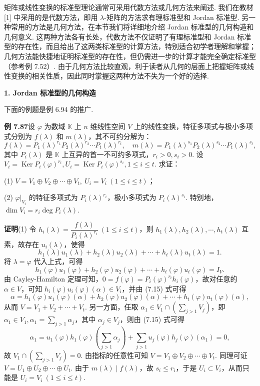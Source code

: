 \documentclass[UTF8, 12pt, fontset=fandol, oneside]{ctexart}
\begin{document}
矩阵或线性变换的标准型理论通常可采用代数方法或几何方法来阐述. 我们在教材 [1] 中采用的是代数方法，即用 $\lambda$-矩阵的方法求有理标准型和 Jordan 标准型. 另一种常用的方法是几何方法，在本节我们将详细地介绍 Jordan 标准型的几何构造和几何意义. 这两种方法各有长处，代数方法不仅证明了有理标准型和 Jordan 标准型的存在性，而且给出了这两类标准型的计算方法，特别适合初学者理解和掌握；几何方法能快捷地证明标准型的存在性，但仍需进一步的计算才能完全确定标准型（参考例 7.52）. 由于几何方法比较直观，利于读者从几何的层面上把握矩阵或线性变换的相关性质，因此同时掌握这两种方法不失为一个好的选择.

\noindent\textbf{1. Jordan 标准型的几何构造}

下面的例题是例 6.94 的推广.

\noindent\textbf{例 7.87}\quad 设 $\varphi$ 为数域 $\mathbb{K}$ 上 $n$ 维线性空间 $V$ 上的线性变换，特征多项式与极小多项式分别为 $f(\lambda)$ 和 $m(\lambda)$，其不可约分解为：
\[
f(\lambda)=P_1(\lambda)^{r_1}P_2(\lambda)^{r_2}\cdots P_t(\lambda)^{r_t},\quad
m(\lambda)=P_1(\lambda)^{s_1}P_2(\lambda)^{s_2}\cdots P_t(\lambda)^{s_t},
\]
其中 $P_i(\lambda)$ 是 $\mathbb{K}$ 上互异的首一不可约多项式，$r_i>0,s_i>0$. 设 $V_i=\operatorname{Ker}P_i(\varphi)^{r_i},U_i=\operatorname{Ker}P_i(\varphi)^{s_i},1\le i\le t$. 求证：

(1) $V=V_1\oplus V_2\oplus\cdots\oplus V_t,\ U_i=V_i\ (1\le i\le t)$；

(2) $\varphi|_{V_i}$ 的特征多项式为 $P_i(\lambda)^{r_i}$，极小多项式为 $P_i(\lambda)^{s_i}$. 特别地，$\dim V_i=r_i\deg P_i(\lambda)$.

\noindent\textbf{证明}\quad (1) 令 $h_i(\lambda)=\dfrac{f(\lambda)}{P_i(\lambda)^{r_i}}\ (1\le i\le t)$，则 $h_1(\lambda),h_2(\lambda),\cdots,h_t(\lambda)$ 互素，故存在 $u_i(\lambda)$，使得
\[
h_1(\lambda)u_1(\lambda)+h_2(\lambda)u_2(\lambda)+\cdots+h_t(\lambda)u_t(\lambda)=1.
\]
将 $\lambda=\varphi$ 代入上式，可得
\begin{equation}
h_1(\varphi)u_1(\varphi)+h_2(\varphi)u_2(\varphi)+\cdots+h_t(\varphi)u_t(\varphi)=I_V.
\tag{7.15}
\end{equation}
由 Cayley-Hamilton 定理可知，$0=f(\varphi)=P_i(\varphi)^{r_i}h_i(\varphi)$，故对任意的 $\alpha\in V$，可知 $h_i(\varphi)u_i(\varphi)(\alpha)\in V_i$，并由 (7.15) 式可得
\[
\alpha=h_1(\varphi)u_1(\varphi)(\alpha)+h_2(\varphi)u_2(\varphi)(\alpha)+\cdots+h_t(\varphi)u_t(\varphi)(\alpha),
\]
从而 $V=V_1+V_2+\cdots+V_t$. 另一方面，任取 $\alpha_1\in V_1\cap(\sum_{j>1}V_j)$，即 $\alpha_1\in V_1,\alpha_1=\sum_{j>1}\alpha_j$，其中 $\alpha_j\in V_j$，则由 (7.15) 式可得
\[
\alpha_1=u_1(\varphi)h_1(\varphi)\left(\sum_{j>1}\alpha_j\right)+\sum_{j>1}u_j(\varphi)h_j(\varphi)(\alpha_1)=0,
\]
故 $V_1\cap(\sum_{j>1}V_j)=0$. 由指标的任意性可知 $V=V_1\oplus V_2\oplus\cdots\oplus V_t$. 同理可证 $V=U_1\oplus U_2\oplus\cdots\oplus U_t$. 由于 $m(\lambda)\mid f(\lambda)$，故 $s_i\le r_i$，于是 $U_i\subset V_i$，从而只能是 $U_i=V_i\ (1\le i\le t)$.
\end{document}
